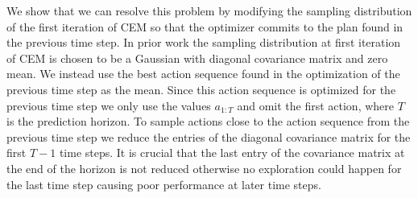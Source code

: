 We show that we can resolve this problem by modifying the sampling distribution of the first iteration of CEM so that the optimizer commits to the plan found in the previous time step. In prior work \cite{sna} the sampling distribution at first iteration of CEM is chosen to be a Gaussian with diagonal covariance matrix and zero mean. We instead use the best action sequence found in the optimization of the previous time step as the mean. Since this action sequence is optimized for the previous time step we only use the values $a_{1:T}$ and omit the first action, where $T$ is the prediction horizon. To sample actions close to the action sequence from the previous time step we reduce the entries of the diagonal covariance matrix for the first $T-1$ time steps. It is crucial that the last entry of the covariance matrix at the end of the horizon is not reduced otherwise no exploration could happen for the last time step causing poor performance at later time steps.